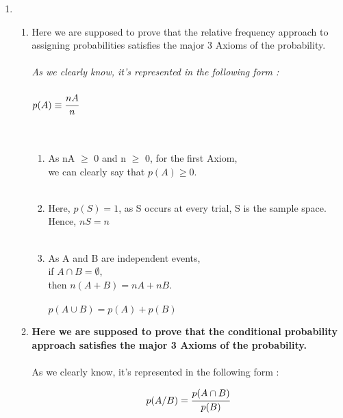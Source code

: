 \documentclass{article}
\begin{document}
\begin{enumerate}
\newpage

\item \large 
\begin{enumerate}
	\item {Here we are supposed to prove that the relative frequency approach to assigning probabilities satisfies the major 3 Axioms of the probability.} \\\\  
        \textit{As we clearly know, it's represented in the following form : }\\\\

        $p(A) \equiv \cfrac{nA}{n}$\\\\\

        \begin{enumerate}
            \item  As nA $\geq$ 0 and n $\geq$ 0, for the first Axiom, \\
            we can clearly say that $p(A) \geq 0.$ \\\ 
            \item Here, $p(S) = 1 $, as S occurs at every trial, S is the sample space. \\
            Hence, $nS = n$ \\\ 
            \item As A and B are independent events, \\
            if $ A \cap B = \emptyset $, \\ 
            then $ n(A + B) = nA + nB .$ \\\\ 
            \therefore \hspace{3mm} $p(A \cup B) = p(A) + p(B)$ \\ 
        \end{enumerate}
        \newpage 

        \item \textbf{Here we are supposed to prove that the conditional probability approach satisfies the major 3 Axioms of the probability.} \\\\  
        As we clearly know, it's represented in the following form :  

        \begin{gather}
        p(A / B) = \cfrac{p(A \cap B)}{p(B)} \nonumber
        \end{gather} \\ 


\end{enumerate}
\end{enumerate}
\end{document}
